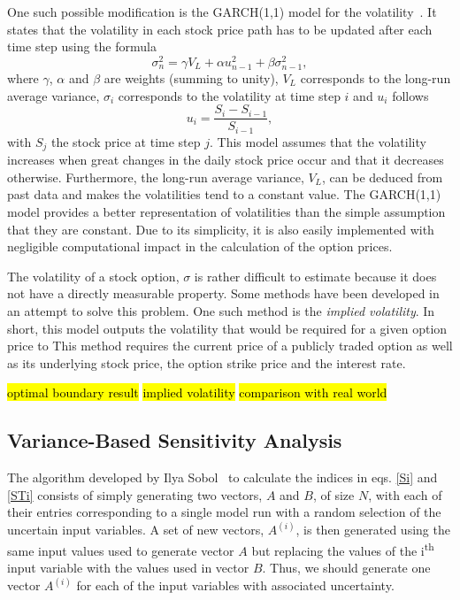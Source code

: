 \documentclass[a4paper,twocolumn,aps,prd,longbibliography,superscriptaddress]{revtex4-1}
\begin{document}
One such possible modification is the GARCH(1,1) model for the volatility~\cite{Wei}.
It states that the volatility in each stock price path has to be updated after each time step using the formula
\begin{equation}
\sigma_n^2=\gamma V_L+\alpha u_{n-1}^2+\beta\sigma_{n-1}^2,
\end{equation}
\noindent where $\gamma$, $\alpha$ and $\beta$ are weights (summing to unity), $V_L$ corresponds to the long-run average variance, $\sigma_i$ corresponds to the volatility at time step $i$ and $u_i$ follows
\begin{equation}
u_i=\frac{S_i-S_{i-1}}{S_{i-1}},
\end{equation}
\noindent with $S_j$ the stock price at time step $j$.
This model assumes that the volatility increases when great changes in the daily stock price occur and that it decreases otherwise. Furthermore, the long-run average variance, $V_L$, can be deduced from past data and makes the volatilities tend to a constant value.
The GARCH(1,1) model provides a better representation of volatilities than the simple assumption that they are constant. Due to its simplicity, it is also easily implemented with negligible computational impact in the calculation of the option prices.

The volatility of a stock option, $\sigma$ is rather difficult to estimate because it does not have a directly measurable property. Some methods have been developed in an attempt to solve this problem. One such method is the \textit{implied volatility}. In short, this model outputs the volatility that would be required for a given option price to This method requires the current price of a publicly traded option as well as its underlying stock price, the option strike price and the interest rate. 

\hl{optimal boundary result}
\hl{implied volatility}
\hl{comparison with real world}

\subsection{Variance-Based Sensitivity Analysis}
The algorithm developed by Ilya Sobol~\cite{Sobol} to calculate the indices in eqs. \eqref{Si} and \eqref{STi} consists of simply generating two vectors, $A$ and $B$, of size $N$, with each of their entries corresponding to a single model run with a random selection of the uncertain input variables.
A set of new vectors, $A^{(i)}$, is then generated using the same input values used to generate vector $A$ but replacing the values of the i\textsuperscript{th} input variable with the values used in vector $B$. Thus, we should generate one vector $A^{(i)}$ for each of the input variables with associated uncertainty.
\end{document}
